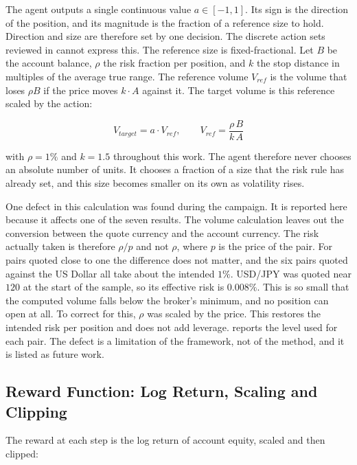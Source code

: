 The agent outputs a single continuous value $a \in [-1, 1]$. Its sign is the direction of the position, and its magnitude is the fraction of a reference size to hold. Direction and size are therefore set by one decision. The discrete action sets reviewed in  cannot express this. The reference size is fixed-fractional. Let $B$ be the account balance, $\rho$ the risk fraction per position, and $k$ the stop distance in multiples of the average true range. The reference volume $V_{ref}$ is the volume that loses $\rho B$ if the price moves $k \cdot A$ against it. The target volume is this reference scaled by the action:

\begin{equation}
V_{target} = a \cdot V_{ref}, \qquad V_{ref} = \frac{\rho \, B}{k \, A}
\label{Equation:PositionSizing}
\end{equation}

with $\rho = 1\%$ and $k = 1.5$ throughout this work. The agent therefore never chooses an absolute number of units. It chooses a fraction of a size that the risk rule has already set, and this size becomes smaller on its own as volatility rises.

One defect in this calculation was found during the campaign. It is reported here because it affects one of the seven results. The volume calculation leaves out the conversion between the quote currency and the account currency. The risk actually taken is therefore $\rho / p$ and not $\rho$, where $p$ is the price of the pair. For pairs quoted close to one the difference does not matter, and the six pairs quoted against the US Dollar all take about the intended $1\%$. USD/JPY was quoted near $120$ at the start of the sample, so its effective risk is $0.008\%$. This is so small that the computed volume falls below the broker's minimum, and no position can open at all. To correct for this, $\rho$ was scaled by the price. This restores the intended risk per position and does not add leverage.  reports the level used for each pair. The defect is a limitation of the framework, not of the method, and it is listed as future work.

\subsection{Reward Function: Log Return, Scaling and Clipping}

The reward at each step is the log return of account equity, scaled and then clipped:

